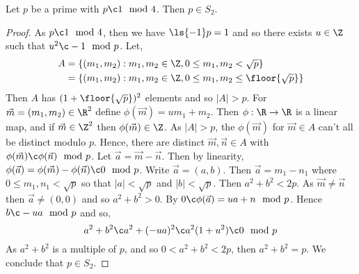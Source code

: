 \begin{nthm}
  Let $p$ be a prime with $p \c 1 \mod 4$. Then $p \in S_2$.
\end{nthm}
\begin{proof}
  As $p\c 1 \mod 4$, then we have $\ls {-1} p = 1$ and so there exists $u \in \Z$ such that $u^2 \c - 1 \mod p$. Let,
  \begin{align*}
    A &= \{(m_1, m_2) : m_1, m_2 \in \Z, 0 \le m_1, m_2 <\sqrt p\} \\
    &= \{(m_1, m_2) : m_1, m_2 \in \Z, 0 \le m_1, m_2 \le \floor{\sqrt p}\}
  \end{align*}
  Then $A$ has $(1 + \floor{\sqrt p})^2$ elements and so $|A| > p$. For $\vec m = (m_1, m_2) \in \R^2$ define $\phi(\vec m) = um_1 + m_2$. Then $\phi : \R \to \R$ is a linear map, and if $\vec m \in \Z^2$ then $\phi(\vec m) \in \Z$. As $|A| > p$, the $\phi(\vec m)$
  for $\vec m \in A$ can't all be distinct modulo $p$. Hence, there are distinct $\vec m, \vec n \in A$ with $\phi(\vec m) \c \phi(\vec n)\mod p$. Let $\vec a = \vec m - \vec n$. Then by linearity, $\phi(\vec a) = \phi(\vec m) - \phi(\vec n) \c 0 \mod p$. Write $\vec a = (a, b)$. Then $\vec a = m_1 - n_1$ where
  $0 \le m_1,n_1 < \sqrt p$ so that $|a| < \sqrt p$ and $|b| < \sqrt p$. Then $a^2 + b^2 < 2p$. As $\vec m \ne \vec n$ then $\vec a \ne (0, 0)$ and so $a^2 + b^2 > 0$. By $0 \c \phi(\vec a) = ua + n \mod p$. Hence $b \c -ua \mod p$ and so,
  $$ a^2 + b^2 \c a^2 + (-ua)^2 \c a^2(1 + u^2) \c 0 \mod p $$
  As $a^2 + b^2$ is a multiple of $p$, and so $0 < a^2 + b^2 < 2p$, then $a^2 + b^2 = p$. We conclude that $p \in S_2$.
\end{proof}

